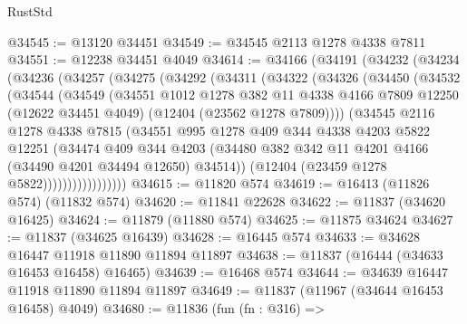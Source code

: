 \begin{lexlean}{RustStd}
\begin{coremodule}
@34545 := @13120 @34451
@34549 := @34545 @2113 @1278 @4338 @7811
@34551 := @12238 @34451 @4049
@34614 := @34166
    (@34191
      (@34232
        (@34234
          (@34236
            (@34257
              (@34275
                (@34292
                  (@34311
                    (@34322
                      (@34326
                        (@34450
                          (@34532
                            (@34544
                              (@34549
                                (@34551
                                  @1012
                                  @1278
                                  @382
                                  @11
                                  @4338
                                  @4166
                                  @7809
                                  @12250
                                  (@12622 @34451 @4049)
                                  (@12404 (@23562 @1278 @7809))))
                              (@34545
                                @2116
                                @1278
                                @4338
                                @7815
                                (@34551
                                  @995
                                  @1278
                                  @409
                                  @344
                                  @4338
                                  @4203
                                  @5822
                                  @12251
                                  (@34474
                                    @409
                                    @344
                                    @4203
                                    (@34480
                                      @382
                                      @342
                                      @11
                                      @4201
                                      @4166
                                      (@34490 @4201 @34494 @12650)
                                      @34514))
                                  (@12404 (@23459 @1278 @5822)))))))))))))))))
@34615 := @11820 @574
@34619 := @16413 (@11826 @574) (@11832 @574)
@34620 := @11841 @22628
@34622 := @11837 (@34620 @16425)
@34624 := @11879 (@11880 @574)
@34625 := @11875 @34624
@34627 := @11837 (@34625 @16439)
@34628 := @16445 @574
@34633 := @34628 @16447 @11918 @11890 @11894 @11897
@34638 := @11837 (@16444 (@34633 @16453 @16458) @16465)
@34639 := @16468 @574
@34644 := @34639 @16447 @11918 @11890 @11894 @11897
@34649 := @11837 (@11967 (@34644 @16453 @16458) @4049)
@34680 := @11836
    (fun (fn : @316) =>

\end{coremodule}
\end{lexlean}
